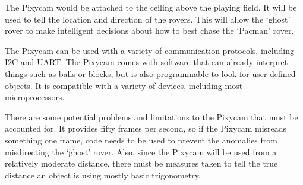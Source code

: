 \documentclass[12pt,letterpaper]{article}
\begin{document}
The Pixycam would be attached to the ceiling above the playing field. It will be used to tell the location and direction of the rovers. This will allow the ‘ghost’ rover to make intelligent decisions about how to best chase the ‘Pacman’ rover. 

The Pixycam can be used with a variety of communication protocols, including I2C and UART. The Pixycam comes with software that can already interpret things such as balls or blocks, but is also programmable to look for user defined objects. It is compatible with a variety of devices, including most microprocessors. 

There are some potential problems and limitations to the Pixycam that must be accounted for. It provides fifty frames per second, so if the Pixycam misreads something one frame, code needs to be used to prevent the anomalies from misdirecting the ‘ghost’ rover. Also, since the Pixycam will be used from a relatively moderate distance, there must be measures taken to tell the true distance an object is using mostly basic trigonometry. 
\end{document}
